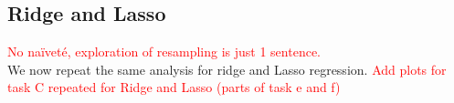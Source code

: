 \documentclass[twocolumn,english,notitlepage]{article}
\newcommand{\comment}[1]{\textcolor{red}{#1}}
\begin{document}

    

    \subsection{Ridge and Lasso}
        \comment{No naïveté, exploration of resampling is just 1 sentence.}\\
        We now repeat the same analysis for ridge and Lasso regression. \comment{Add plots for task C repeated for Ridge and Lasso (parts of task e and f)}
        
\end{document}
